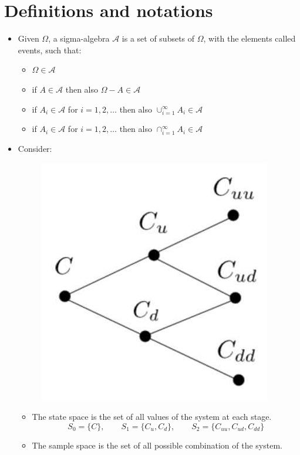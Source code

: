 \documentclass[12pt, openany]{report}
\newcommand{\A}{\mathcal{A}}
\theoremstyle{definition}
\begin{document}
\setcounter{tocdepth}{1}
\tableofcontents
\chapter{Definitions and notations}
\begin{itemize}
	\item Given $\Omega$, a sigma-algebra $\A$ is a set of subsets of $\Omega$, with the elements called events, such that:
	\begin{itemize}
		\item $\Omega \in \A$
		\item if $A \in \A$ then also $\Omega - A \in \A$
		\item if $A_i \in \A$ for $i = 1,2, \dots$ then also $\cup_{i=1}^\infty A_i \in \A$
		\item if $A_i \in \A$ for $i = 1,2, \dots$ then also $\cap_{i=1}^\infty A_i \in \A$
	\end{itemize}
	\item Consider: 
	\begin{figure}[H]
		\centering
		\includegraphics[scale=0.25]{img/space.jpg} 
	\end{figure}
	\begin{itemize}
		\item The state space is the set of all values of the system at each stage. 
		\begin{equation}
			S_0 = \{C\},\qquad S_1 = \{C_u, C_d\},\qquad S_2 = \{C_{uu}, C_{ud}, C_{dd}\}
		\end{equation}
		\item  The sample space is the set of all possible combination of the system.

\end{itemize}
\end{itemize}
\end{document}
